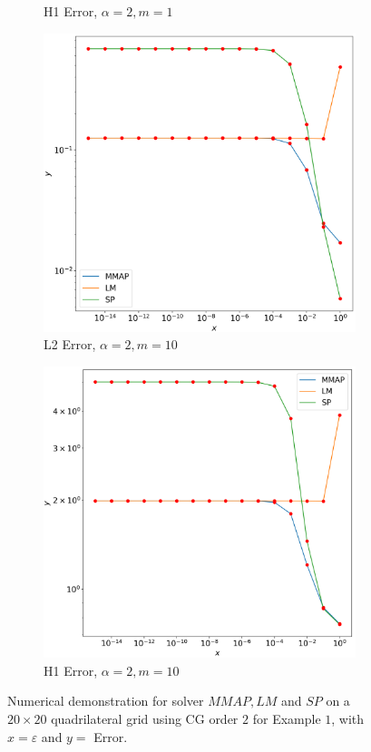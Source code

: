 \documentclass[12pt]{ociamthesis}
\begin{document}
\begin{figure}[H]
\begin{subfigure}{0.44\textwidth}
     \caption{H1 Error, $\alpha=2, m=1$}
 \end{subfigure}
 \begin{subfigure}{0.44\textwidth}
     \includegraphics[width=\textwidth]{Pics/LHSims/E1c_MMAP_LM_SPL2.png}
     \caption{L2 Error, $\alpha=2, m=10$}
 \end{subfigure}
 \hfill
 \begin{subfigure}{0.44\textwidth}
     \includegraphics[width=\textwidth]{Pics/LHSims/E1c_MMAP_LM_SPH1.png}
     \caption{H1 Error, $\alpha=2, m=10$}
 \end{subfigure}
 \caption{Numerical demonstration for solver $MMAP, LM$ and $SP$ on a $20\times 20$ quadrilateral grid using CG order $2$ for Example $1$, with $x=\varepsilon$ and $y=$ Error.} \label{E1_LM_SP}
\end{figure}
\end{document}
